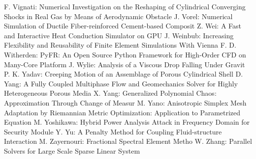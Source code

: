\documentclass[10pt, A4]{article}%
\begin{document}
{F. Vignati}: {Numerical Investigation on the Reshaping of Cylindrical Converging Shocks in Real Gas by Means of Aerodynamic Obstacle}
{J. Vorel}: {Numerical Simulation of Ductile Fiber-reinforced Cement-based Composit}
{Z. Wei}: {A Fast and Interactive Heat Conduction Simulator on GPU}
{J. Weinbub}: {Increasing Flexibility and Reusability of Finite Element Simulations With Vienna}
{F. D. Witherden}: {PyFR: An Open Source Python Framework for High-Order CFD on Many-Core Platform}
{J. Wylie}: {Analysis of a Viscous Drop Falling Under Gravit}
{P. K. Yadav}: {Creeping Motion of an Assemblage of Porous Cylindrical Shell}
{D. Yang}: {A Fully Coupled Multiphase Flow and Geomechanics Solver for Highly Heterogeneous Porous Media}
{X. Yang}: {Generalized Polynomial Chaos: Approximation Through Change of Measur}
{M. Yano}: {Anisotropic Simplex Mesh Adaptation by Riemannian Metric Optimization: Application to Parametrized Equation}
{M. Yoshikawa}: {Hybrid Power Analysis Attack in Frequency Domain for Security Module}
{Y. Yu}: {A Penalty Method for Coupling Fluid-structure Interaction}
{M. Zayernouri}: {Fractional Spectral Element Metho}
{W. Zhang}: {Parallel Solvers for Large Scale Sparse Linear System}
\end{document}
